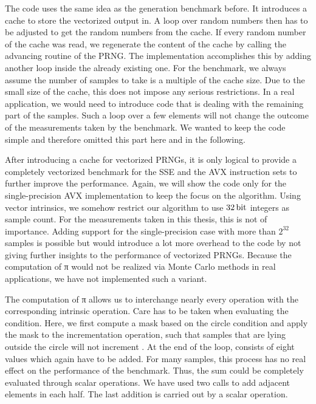 \documentclass{stdlocal}
\begin{document}
    The code uses the same idea as the generation benchmark before.
    It introduces a cache to store the vectorized output in.
    A loop over random numbers then has to be adjusted to get the random numbers from the cache.
    If every random number of the cache was read, we regenerate the content of the cache by calling the advancing routine of the PRNG.
    The implementation accomplishes this by adding another  loop inside the already existing one.
    For the benchmark, we always assume the number of samples to take is a multiple of the cache size.
    Due to the small size of the cache, this does not impose any serious restrictions.
    In a real application, we would need to introduce code that is dealing with the remaining part of the samples.
    Such a loop over a few elements will not change the outcome of the measurements taken by the benchmark.
    We wanted to keep the code simple and therefore omitted this part here and in the following.

    After introducing a cache for vectorized PRNGs, it is only logical to provide a completely vectorized benchmark for the SSE and the AVX instruction sets to further improve the performance.
    Again, we will show the code only for the single-precision AVX implementation to keep the focus on the algorithm.
    Using vector intrinsics, we somehow restrict our algorithm to use $32\, \mathrm{bit}$ integers as sample count.
    For the measurements taken in this thesis, this is not of importance.
    Adding support for the single-precision case with more than $2^{32}$ samples is possible but would introduce a lot more overhead to the code by not giving further insights to the performance of vectorized PRNGs.
    Because the computation of π would not be realized via Monte Carlo methods in real applications, we have not implemented such a variant.

    The computation of π allows us to interchange nearly every operation with the corresponding intrinsic operation.
    Care has to be taken when evaluating the condition.
    Here, we first compute a mask based on the circle condition and apply the mask to the incrementation operation, such that samples that are lying outside the circle will not increment .
    At the end of the  loop,  consists of eight values which again have to be added.
    For many samples, this process has no real effect on the performance of the benchmark.
    Thus, the sum could be completely evaluated through scalar operations.
    We have used two  calls to add adjacent elements in each half.
    The last addition is carried out by a scalar operation.
\end{document}
